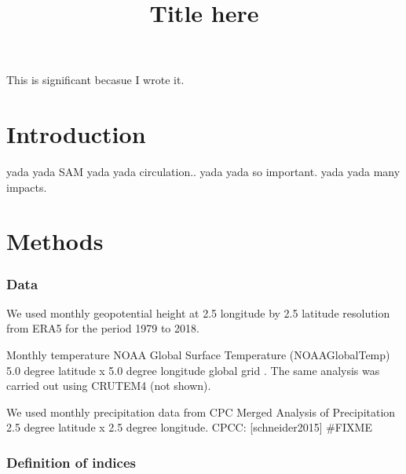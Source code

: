 \documentclass[]{ametsocV5}
\title{Title here}
\affiliation{CIMA UBA blablabla}
\begin{document}
\maketitle


%
%
\statement
This is significant becasue I wrote it.



%

\section{Introduction}

yada yada SAM yada yada circulation.. yada yada so important. yada yada
many impacts.

\section{Methods}

\subsubsection{Data}

We used monthly geopotential height at 2.5 longitude by 2.5 latitude
resolution from ERA5 \citep{hersbach} for the period 1979 to 2018.

Monthly temperature NOAA Global Surface Temperature (NOAAGlobalTemp) 5.0
degree latitude x 5.0 degree longitude global grid
\citep{vose2012, smith2008}. The same analysis was carried out using
CRUTEM4 \citep{osborn2014} (not shown).

We used monthly precipitation data from CPC Merged Analysis of
Precipitation \citep{xie1997} 2.5 degree latitude x 2.5 degree
longitude. CPCC: {[}schneider2015{]} \#FIXME

\subsubsection{Definition of indices}
\end{document}
